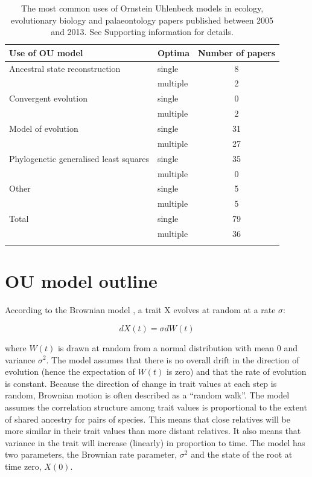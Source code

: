\documentclass[a4paper,12pt]{article}
\begin{document}
    \begin{table}[!htbp]
      \begin{center}
        \caption{The most common uses of Ornstein Uhlenbeck models in ecology, evolutionary biology and palaeontology papers published between 2005 and 2013. See Supporting information for details.}
        \bigskip  
          \begin{tabular}{p{8cm}lc}
            \hline
            Use of OU model & Optima & Number of papers\\
            \hline
            Ancestral state reconstruction & single & 8\\
            & multiple & 2\\
            Convergent evolution & single & 0\\
            & multiple & 2\\
            Model of evolution & single & 31\\
            & multiple & 27\\
            Phylogenetic generalised least squares & single & 35\\
            & multiple & 0\\
            Other & single & 5\\
            & multiple & 5\\
            Total & single &  79\\
            & multiple & 36\\
            \hline
            \label{table.uses}
          \end{tabular}
      \end{center}
\end{table}
    
\section{OU model outline}
  
  According to the Brownian model \citep{cavalli1967,felsenstein1973maximum}, a trait X evolves at random at a rate $\sigma$:

      \begin{equation}
        dX(t) = \sigma dW(t)
      \end{equation}
    
    \noindent
    where $W(t)$ is drawn at random from a normal distribution with mean $0$ and variance $\sigma^2$. 
    The model assumes that there is no overall drift in the direction of evolution (hence the expectation of $W(t)$ is zero) and that the rate of evolution is constant. 
    Because the direction of change in trait values at each step is random, Brownian motion is often described as a ``random walk''.
    The model assumes the correlation structure among trait values is proportional to the extent of shared ancestry for pairs of species. 
    This means that close relatives will be more similar in their trait values than more distant relatives. 
    It also means that variance in the trait will increase (linearly) in proportion to time. 
    The model has two parameters, the Brownian rate parameter, $\sigma^2$ and the state of the root at time zero, $X(0)$. 
\end{document}
